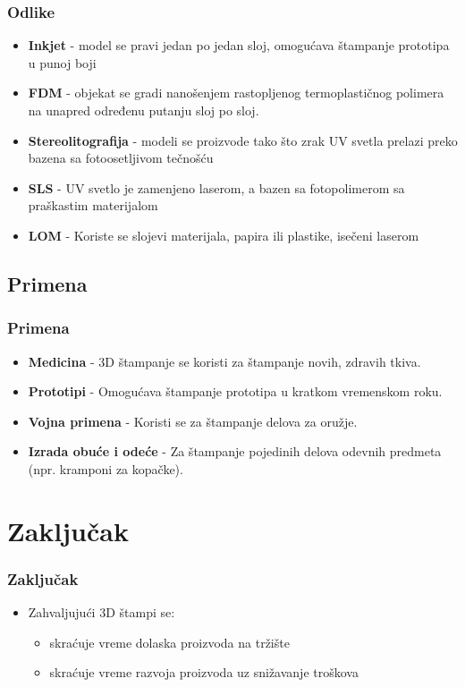 \documentclass{beamer}
\begin{document}
\begin{frame}[fragile]\frametitle{Odlike }
	\begin{itemize}	
		\item \textbf{Inkjet} - model se pravi jedan po jedan sloj, omogućava štampanje prototipa u punoj boji
		\item \textbf{FDM} - objekat se gradi nanošenjem rastopljenog termoplastičnog polimera na unapred određenu putanju sloj po sloj. 
            \item \textbf{Stereolitografija} - modeli se proizvode tako što zrak UV svetla prelazi preko bazena sa fotoosetljivom tečnošću
            \item \textbf{SLS} - UV svetlo je zamenjeno laserom, a bazen sa fotopolimerom sa praškastim materijalom
            \item \textbf{LOM} - Koriste se slojevi materijala, papira ili plastike, isečeni laserom
            
	\end{itemize}

\end{frame}






\subsection{Primena}

\begin{frame}[fragile]\frametitle{Primena}
	\begin{itemize}
	    \item \textbf{Medicina} - 3D štampanje se koristi za štampanje novih, zdravih tkiva.
	    \item \textbf{Prototipi} - Omogućava štampanje prototipa u kratkom vremenskom roku.
	    \item \textbf{Vojna primena} - Koristi se za štampanje delova za oružje.
	    \item \textbf{Izrada obuće i odeće} - Za štampanje pojedinih delova odevnih predmeta (npr. kramponi za kopačke).  
	\end{itemize}
\end{frame}

\section{Zaključak}

\begin{frame}[fragile]\frametitle{Zaključak}
	\begin{itemize}
	\item Zahvaljujući 3D štampi se:
\begin{itemize}
\item skraćuje vreme dolaska proizvoda na tržište
\item skraćuje vreme razvoja proizvoda uz snižavanje troškova
\end{itemize}
	\end{itemize}
\end{frame}
\end{document}
